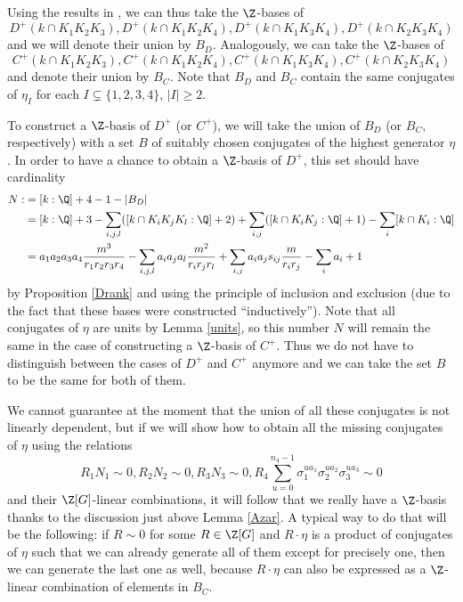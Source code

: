 Using the results in \citep{Kucera2016}, we can thus take the $\Z$-bases of $$D^+(k\cap K_1K_2K_3),D^+(k\cap K_1K_2K_4),D^+(k\cap K_1K_3K_4),D^+(k\cap K_2K_3K_4)$$
and we will denote their union by $B_D$. Analogously, we can take the $\Z$-bases of $$C^+(k\cap K_1K_2K_3),C^+(k\cap K_1K_2K_4),C^+(k\cap K_1K_3K_4),C^+(k\cap K_2K_3K_4)$$
and denote their union by $B_C$. Note that $B_D$ and $B_C$ contain the same conjugates of $\eta_I$ for each $I\subsetneq \{1,2,3,4\}$, $|I|\geq 2$.

To construct a $\Z$-basis of $D^+$ (or $C^+$), we will take the union of $B_D$ (or $B_C$, respectively) with a set $B$ of suitably chosen conjugates of the highest generator $\eta$. In order to have a chance to obtain a $\Z$-basis of $D^+$, this set should have cardinality
\begin{equation}\label{Ndef}
\begin{split}
N:&=[k:\Q]+4-1-|B_D|\\
&=[k:\Q]+3-\sum_{i,j,l}([k\cap K_iK_jK_l:\Q]+2)+\sum_{i,j}([k\cap K_iK_j:\Q]+1)-\sum_{i}[k\cap K_i:\Q]\\
&=a_1a_2a_3a_4\frac{m^3}{r_1r_2r_3r_4}-\sum_{i,j,l}a_ia_ja_l\frac{m^2}{r_ir_jr_l}+\sum_{i,j}
a_ia_js_{ij}\frac{m}{r_ir_j}-\sum_{i}a_i+1
\end{split}
\end{equation}
by Proposition \ref{Drank} and using the principle of inclusion and exclusion (due to the fact that these bases were constructed \enquote{inductively}). Note that all conjugates of $\eta$ are units by Lemma \ref{units}, so this number $N$ will remain the same in the case of constructing a $\Z$-basis of $C^+$. Thus we do not have to distinguish between the cases of $D^+$ and $C^+$ anymore and we can take the set $B$ to be the same for both of them.

We cannot guarantee at the moment that the union of all these conjugates is not linearly dependent, but if we will show how to obtain all the missing conjugates of $\eta$ using the relations $$R_1N_1\sim 0, R_2N_2\sim 0, R_3N_3\sim 0, R_4\sum_{u=0}^{n_4-1}\sigma_1^{ua_1}\sigma_2^{ua_2}\sigma_3^{ua_3}\sim 0$$
and their $\Z[G]$-linear combinations, it will follow that we really have a $\Z$-basis thanks to the discussion just above Lemma \ref{Azar}. A typical way to do that will be the following: if $R\sim 0$ for some $R\in\Z[G]$ and $R\cdot \eta$ is a product of conjugates of $\eta$ such that we can already generate all of them except for precisely one, then we can generate the last one as well, because $R\cdot \eta$ can also be expressed as a $\Z$-linear combination of elements in $B_C$.

